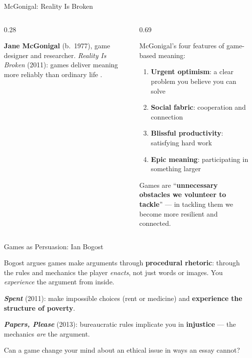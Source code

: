 \documentclass[aspectratio=169,11pt]{beamer}
\begin{document}
\begin{frame}[t]{McGonigal: Reality Is Broken}
\begin{columns}[T]
\begin{column}{0.28\textwidth}
\begin{conceptbox}
\scriptsize
\textbf{Jane McGonigal} (b.~1977), game designer and researcher. \emph{Reality Is Broken} (2011): games deliver meaning more reliably than ordinary life \parencite{mcgonigal_reality_broken}.
\end{conceptbox}
\end{column}
\begin{column}{0.69\textwidth}
\begin{conceptbox}
\footnotesize
McGonigal's four features of game-based meaning:
\begin{enumerate}
    \item \textbf{Urgent optimism}: a clear problem you believe you can solve
    \item \textbf{Social fabric}: cooperation and connection
    \item \textbf{Blissful productivity}: satisfying hard work
    \item \textbf{Epic meaning}: participating in something larger
\end{enumerate}

\vspace{0.05cm}
Games are ``\textbf{unnecessary obstacles we volunteer to tackle}'' --- in tackling them we become more resilient and connected.
\end{conceptbox}
\end{column}
\end{columns}
\end{frame}

\begin{frame}[t]{Games as Persuasion: Ian Bogost}
\begin{conceptbox}
\footnotesize
Bogost argues games make arguments through \textbf{procedural rhetoric}: through the rules and mechanics the player \emph{enacts}, not just words or images. You \emph{experience} the argument from inside.
\end{conceptbox}

\vspace{0.05cm}
\begin{casestudybox}
\scriptsize
\textbf{\emph{Spent}} (2011): make impossible choices (rent or medicine) and \textbf{experience the structure of poverty}.

\textbf{\emph{Papers, Please}} (2013): bureaucratic rules implicate you in \textbf{injustice} --- the mechanics \emph{are} the argument.
\end{casestudybox}

\begin{discussionbox}[Discussion]
\scriptsize
Can a game change your mind about an ethical issue in ways an essay cannot?
\end{discussionbox}
\end{frame}
\end{document}

